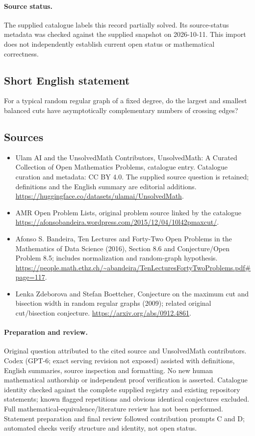 \documentclass[11pt]{article}
\begin{document}
\paragraph{Source status.}
The supplied catalogue labels this record partially solved. Its source-status metadata was checked against the supplied snapshot on 2026-10-11. This import does not independently establish current open status or mathematical correctness.
\subsection{Short English statement}
For a typical random regular graph of a fixed degree, do the largest and smallest balanced cuts have asymptotically complementary numbers of crossing edges?
\subsection{Sources}
\begin{itemize}
\item[\hypertarget{source:statement:1}{S1}] Ulam AI and the UnsolvedMath Contributors, UnsolvedMath: A Curated Collection of Open Mathematics Problems, catalogue entry. Catalogue curation and metadata: CC BY 4.0. The supplied source question is retained; definitions and the English summary are editorial additions.
\url{https://huggingface.co/datasets/ulamai/UnsolvedMath}.
\item[\hypertarget{source:statement:2}{S2}] AMR Open Problem Lists, original problem source linked by the catalogue
\url{https://afonsobandeira.wordpress.com/2015/12/04/10l42pmaxcut/}.
\item[\hypertarget{source:statement:3}{S3}] Afonso S. Bandeira, Ten Lectures and Forty-Two Open Problems in the Mathematics of Data Science (2016), Section 8.6 and Conjecture/Open Problem 8.5; includes normalization and random-graph hypothesis.
\url{https://people.math.ethz.ch/~abandeira/TenLecturesFortyTwoProblems.pdf#page=117}.
\item[\hypertarget{source:statement:4}{S4}] Lenka Zdeborova and Stefan Boettcher, Conjecture on the maximum cut and bisection width in random regular graphs (2009); related original cut/bisection conjecture.
\url{https://arxiv.org/abs/0912.4861}.
\end{itemize}
\paragraph{Preparation and review.}
Original question attributed to the cited source and UnsolvedMath contributors. Codex (GPT-6; exact serving revision not exposed) assisted with definitions, English summaries, source inspection and formatting. No new human mathematical authorship or independent proof verification is asserted. Catalogue identity checked against the complete supplied registry and existing repository statements; known flagged repetitions and obvious identical conjectures excluded. Full mathematical-equivalence/literature review has not been performed. Statement preparation and final review followed contribution prompts C and D; automated checks verify structure and identity, not open status.
\label{end:statement}
\end{document}
